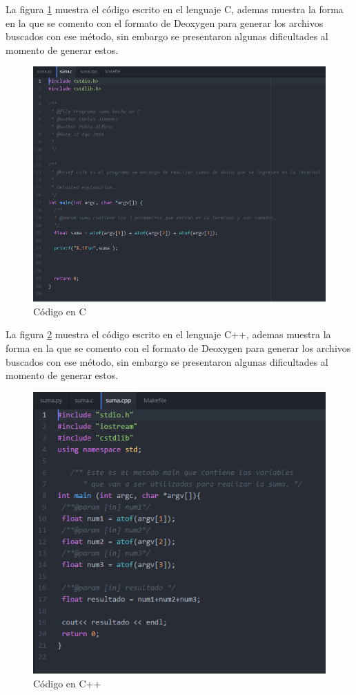 \documentclass[11pt]{article}
\begin{document}
La figura \ref{fig:c} muestra el código escrito en el lenguaje C, ademas muestra la forma en la que se comento con el formato de Deoxygen para generar los archivos buscados con ese método, sin embargo se presentaron algunas dificultades al momento de generar estos.

\begin{figure}[H]
\centering
\includegraphics[scale=0.8]{img/c.png}
\caption{Código en C}
\label{fig:c}
\end{figure}
\newpage

La figura \ref{fig:cp} muestra el código escrito en el lenguaje C++, ademas muestra la forma en la que se comento con el formato de Deoxygen para generar los archivos buscados con ese método, sin embargo se presentaron algunas dificultades al momento de generar estos.

\begin{figure}[H]
\centering
\includegraphics[scale=0.8]{img/cp.png}
\caption{Código en C++}
\label{fig:cp}
\end{figure}
\newpage
\end{document}
